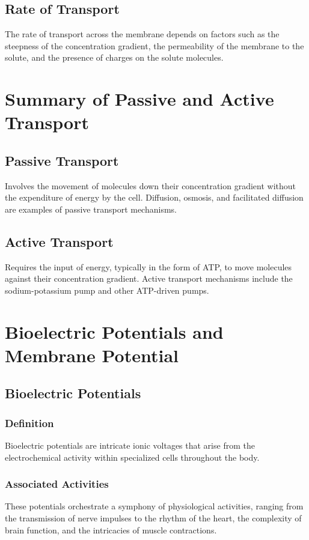 \documentclass{article}
\begin{document}
\subsection{Rate of Transport}
The rate of transport across the membrane depends on factors such as the steepness of the concentration gradient, the permeability of the membrane to the solute, and the presence of charges on the solute molecules.

\section*{Summary of Passive and Active Transport}

\subsection{Passive Transport}
Involves the movement of molecules down their concentration gradient without the expenditure of energy by the cell. Diffusion, osmosis, and facilitated diffusion are examples of passive transport mechanisms.

\subsection{Active Transport}
Requires the input of energy, typically in the form of ATP, to move molecules against their concentration gradient. Active transport mechanisms include the sodium-potassium pump and other ATP-driven pumps.

\section*{Bioelectric Potentials and Membrane Potential}

\subsection{Bioelectric Potentials}

\subsubsection{Definition}
Bioelectric potentials are intricate ionic voltages that arise from the electrochemical activity within specialized cells throughout the body.

\subsubsection{Associated Activities}
These potentials orchestrate a symphony of physiological activities, ranging from the transmission of nerve impulses to the rhythm of the heart, the complexity of brain function, and the intricacies of muscle contractions.
\end{document}
